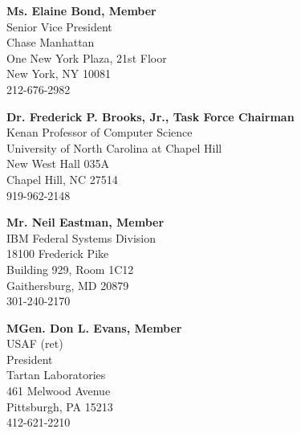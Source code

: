 \documentclass[12pt]{article}
\begin{document}
\medskip

\textbf{Ms. Elaine Bond, Member}\\
\hspace*{2cm}Senior Vice President\\
\hspace*{2cm}Chase Manhattan\\
\hspace*{2cm}One New York Plaza, 21st Floor\\
\hspace*{2cm}New York, NY 10081\\
\hspace*{2cm}212-676-2982

\medskip

\textbf{Dr. Frederick P. Brooks, Jr., Task Force Chairman}\\
\hspace*{2cm}Kenan Professor of Computer Science\\
\hspace*{2cm}University of North Carolina at Chapel Hill\\
\hspace*{2cm}New West Hall 035A\\
\hspace*{2cm}Chapel Hill, NC 27514\\
\hspace*{2cm}919-962-2148

\medskip

\textbf{Mr. Neil Eastman, Member}\\
\hspace*{2cm}IBM Federal Systems Division\\
\hspace*{2cm}18100 Frederick Pike\\
\hspace*{2cm}Building 929, Room 1C12\\
\hspace*{2cm}Gaithersburg, MD 20879\\
\hspace*{2cm}301-240-2170

\medskip

\textbf{MGen. Don L. Evans, Member}\\
\hspace*{2cm}USAF (ret)\\
\hspace*{2cm}President\\
\hspace*{2cm}Tartan Laboratories\\
\hspace*{2cm}461 Melwood Avenue\\
\hspace*{2cm}Pittsburgh, PA 15213\\
\hspace*{2cm}412-621-2210
\end{document}
